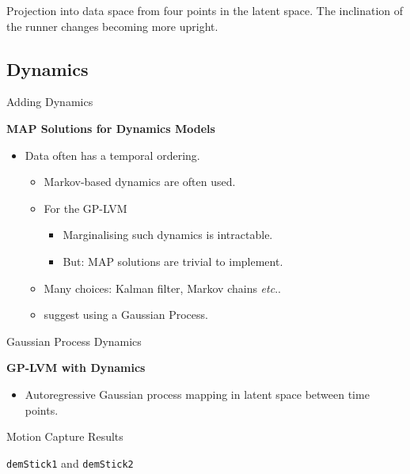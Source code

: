 \vspace{0.3cm}

\small Projection into data space from four points in the latent
space. The inclination of the runner changes becoming more upright.


\subsection{Dynamics}

Adding Dynamics

\textbf{MAP Solutions for Dynamics Models}
\begin{itemize}
\item Data often has a temporal ordering.

\begin{itemize}
\item Markov-based dynamics are often used.
\item For the GP-LVM

\begin{itemize}
\item Marginalising such dynamics is intractable.
\item But: MAP solutions are trivial to implement.
\end{itemize}
\item Many choices: Kalman filter, Markov chains \emph{etc}..
\item \cite{Wang:gpdm05} suggest using a Gaussian Process.
\end{itemize}
\end{itemize}
Gaussian Process Dynamics

\textbf{GP-LVM with Dynamics}
\begin{itemize}
\item Autoregressive Gaussian process mapping in latent space between time
points.


\begin{center}
%
\begin{figure}
\centering{}
\end{figure}

\par\end{center}

\end{itemize}
Motion Capture Results

\texttt{demStick1} and \texttt{demStick2} 

